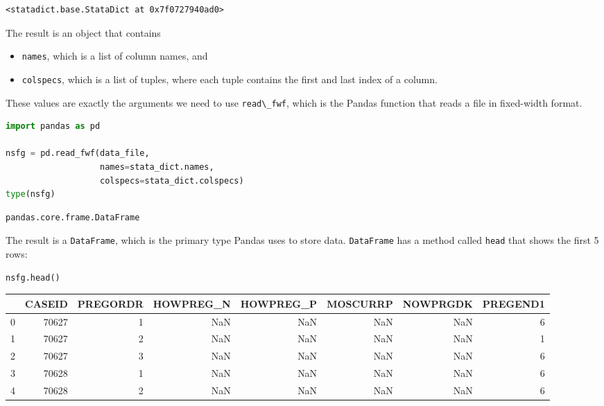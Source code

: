 \begin{lstlisting}[style=output]
<statadict.base.StataDict at 0x7f0727940ad0>
\end{lstlisting}

The result is an object that contains

\begin{itemize}
\item
  \passthrough{\lstinline!names!}, which is a list of column names, and
\item
  \passthrough{\lstinline!colspecs!}, which is a list of tuples, where
  each tuple contains the first and last index of a column.
\end{itemize}

These values are exactly the arguments we need to use
\passthrough{\lstinline!read\_fwf!}, which is the Pandas function that
reads a file in fixed-width format.

\begin{lstlisting}[language=Python,style=source]
import pandas as pd

nsfg = pd.read_fwf(data_file,
                   names=stata_dict.names,
                   colspecs=stata_dict.colspecs)
type(nsfg)
\end{lstlisting}

\begin{lstlisting}[style=output]
pandas.core.frame.DataFrame
\end{lstlisting}

The result is a \passthrough{\lstinline!DataFrame!}, which is the
primary type Pandas uses to store data.
\passthrough{\lstinline!DataFrame!} has a method called
\passthrough{\lstinline!head!} that shows the first 5 rows:

\begin{lstlisting}[language=Python,style=source]
nsfg.head()
\end{lstlisting}



\begin{tabular}{lrrrrrrr}
\toprule
 & CASEID & PREGORDR & HOWPREG\_N & HOWPREG\_P & MOSCURRP & NOWPRGDK & PREGEND1 \\
\midrule
0 & 70627 & 1 & NaN & NaN & NaN & NaN & 6 \\
1 & 70627 & 2 & NaN & NaN & NaN & NaN & 1 \\
2 & 70627 & 3 & NaN & NaN & NaN & NaN & 6 \\
3 & 70628 & 1 & NaN & NaN & NaN & NaN & 6 \\
4 & 70628 & 2 & NaN & NaN & NaN & NaN & 6 \\
\bottomrule
\end{tabular}

